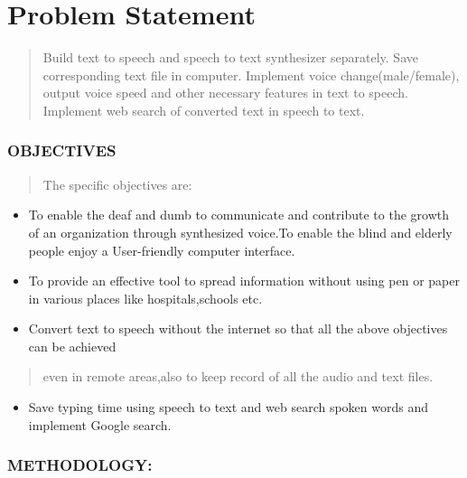 \documentclass[]{article}
\begin{document}
\section{Problem Statement}\label{problem-statement}

\begin{quote}
Build text to speech and speech to text synthesizer separately. Save
corresponding text ﬁle in computer. Implement voice change(male/female),
output voice speed and other necessary features in text to speech.
Implement web search of converted text in speech to text.
\end{quote}

\subsubsection{OBJECTIVES}\label{objectives}

\begin{quote}
The speciﬁc objectives are:
\end{quote}

\begin{itemize}
\item
  To enable the deaf and dumb to communicate and contribute to the
  growth of an organization through synthesized voice.To enable the
  blind and elderly people enjoy a User-friendly computer interface.
\item
  To provide an eﬀective tool to spread information without using pen or
  paper in various places like hospitals,schools etc.
\item
  Convert text to speech without the internet so that all the above
  objectives can be achieved
\end{itemize}

\begin{quote}
even in remote areas,also to keep record of all the audio and text ﬁles.
\end{quote}

\begin{itemize}
\item
  Save typing time using speech to text and web search spoken words and
  implement Google search.
\end{itemize}

\subsubsection{METHODOLOGY:}\label{methodology}
\end{document}
